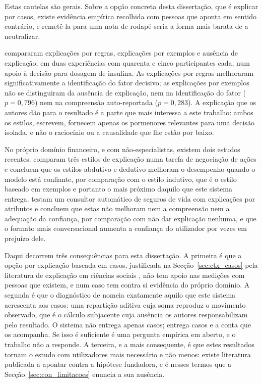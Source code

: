 Estas cautelas são gerais. Sobre a opção concreta desta dissertação, que é explicar por casos,
existe evidência empírica recolhida com pessoas que aponta em sentido contrário, e remetê-la para
uma nota de rodapé seria a forma mais barata de a neutralizar.

\textcite{waa2021xai} compararam explicações por regras, explicações por exemplos e ausência de
explicação, em duas experiências com quarenta e cinco participantes cada, num apoio à decisão para
dosagem de insulina. As explicações por regras melhoraram significativamente a identificação do
fator decisivo; as explicações por exemplos não se distinguiram da ausência de explicação, nem na
identificação do fator ($p = 0{,}796$) nem na compreensão auto-reportada ($p = 0{,}283$). A
explicação que os autores dão para o resultado é a parte que mais interessa a este trabalho:
ambos os estilos, escrevem, fornecem apenas os pormenores relevantes para uma decisão isolada, e
não o raciocínio ou a causalidade que lhe estão por baixo.

No próprio domínio financeiro, e com não-especialistas, existem dois estudos recentes.
\textcite{cau2023logicstyle} comparam três estilos de explicação numa tarefa de negociação de
ações e concluem que os estilos abdutivo e dedutivo melhoram o desempenho quando o modelo está
confiante, por comparação com o estilo indutivo, que é o estilo baseado em exemplos e portanto o
mais próximo daquilo que este sistema entrega. \textcite{bertrand2023featurebased} testam um
consultor automático de seguros de vida com explicações por atributos e concluem que estas não
melhoram nem a compreensão nem a adequação da confiança, por comparação com não dar explicação
nenhuma, e que o formato mais conversacional aumenta a confiança do utilizador por vezes em
prejuízo dele.

Daqui decorrem três consequências para esta dissertação. A primeira é que a opção por explicação
baseada em casos, justificada na Secção~\ref{sec:ctx_casos} pela literatura de explicação em
ciências sociais \autocite{miller2019explanation}, não tem apoio nas medições com pessoas que
existem, e num caso tem contra si evidência do próprio domínio. A segunda é que o diagnóstico de
\textcite{waa2021xai} nomeia exatamente aquilo que este sistema acrescenta aos casos: uma
repartição aditiva cuja soma reproduz o movimento observado, que é o cálculo subjacente cuja
ausência os autores responsabilizam pelo resultado. O sistema não entrega apenas casos; entrega
casos e a conta que os acompanha. Se isso é suficiente é uma pergunta empírica em aberto, e o
trabalho não a responde. A terceira, e a mais consequente, é que estes resultados tornam o estudo
com utilizadores mais necessário e não menos: existe literatura publicada a apontar contra a
hipótese fundadora, e é nesses termos que a Secção~\ref{sec:con_limitacoes} enuncia a sua
ausência.

